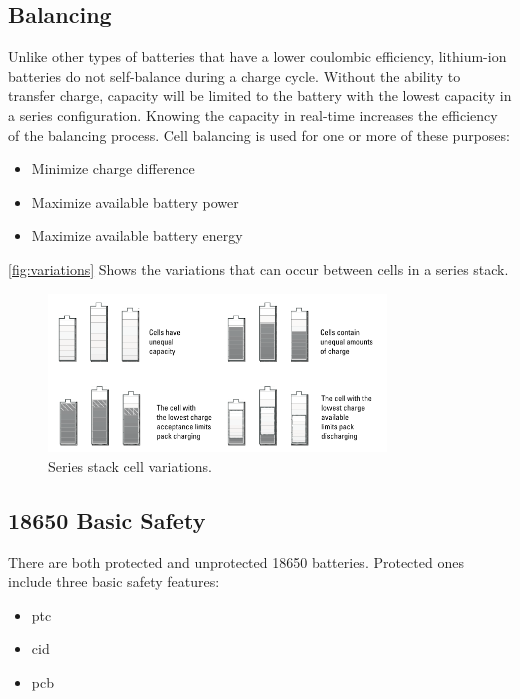 \subsection{Balancing}
Unlike other types of batteries that have a lower coulombic efficiency, lithium-ion batteries do not self-balance during a charge cycle. Without the ability to transfer charge, capacity will be limited to the battery with the lowest capacity in a series configuration. Knowing the capacity in real-time increases the efficiency of the balancing process.
Cell balancing is used for one or more of these purposes\cite{book183}:

\begin{itemize}[noitemsep]
	\item Minimize charge difference
	\item Maximize available battery power
	\item Maximize available battery energy
\end{itemize}

\autoref{fig:variations} Shows the variations that can occur between cells in a series stack.

\begin{figure}[H]
	\centering
	\includegraphics[width=0.8\textwidth]{Figures/variations.png} 
	\caption{Series stack cell variations.}
	\label{fig:variations}
\end{figure}

\subsection{18650 Basic Safety}
There are both protected and unprotected 18650 batteries. Protected ones include three basic safety features\cite{webpage}:

\begin{itemize}[noitemsep]
	\item \gls{ptc}
	\item \gls{cid}
	\item \gls{pcb}
\end{itemize}

